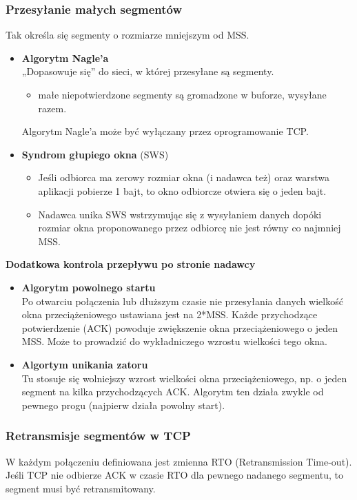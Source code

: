 \documentclass[../main.tex]{subfiles}
\begin{document}
    \subsubsection{Przesyłanie małych segmentów}
    Tak określa się segmenty o rozmiarze mniejszym od MSS.
    \begin{itemize}
        \item \textbf{Algorytm Nagle’a}\\
        „Dopasowuje się” do sieci, w której przesyłane są segmenty.
        \begin{itemize}
            \item małe niepotwierdzone segmenty są gromadzone w buforze, wysyłane razem.
        \end{itemize}
        Algorytm Nagle’a może być wyłączany przez oprogramowanie TCP.
        \item \textbf{Syndrom głupiego okna} (SWS)\\
        \begin{itemize}
            \item Jeśli odbiorca ma zerowy rozmiar okna (i nadawca też) oraz warstwa aplikacji pobierze 1
            bajt, to okno odbiorcze otwiera się o jeden bajt.
            \item Nadawca unika SWS wstrzymując się z wysyłaniem danych dopóki rozmiar okna proponowanego przez odbiorcę nie jest równy co najmniej MSS.
        \end{itemize}
    \end{itemize}

    \textbf{Dodatkowa kontrola przepływu po stronie nadawcy}\\
    \begin{itemize}
        \item \textbf{Algorytm powolnego startu}\\
        Po otwarciu połączenia lub dłuższym czasie nie przesyłania danych wielkość okna
        przeciążeniowego ustawiana jest na 2*MSS. Każde przychodzące potwierdzenie (ACK)
        powoduje zwiększenie okna przeciążeniowego o jeden MSS. Może to prowadzić do wykładniczego wzrostu wielkości tego okna.
        \item \textbf{Algortym unikania zatoru}\\
        Tu stosuje się wolniejszy wzrost wielkości okna przeciążeniowego, np. o jeden
        segment na kilka przychodzących ACK. Algorytm ten działa zwykle od pewnego progu (najpierw działa powolny start).
    \end{itemize}


    \subsubsection{Retransmisje segmentów w TCP}
    W każdym połączeniu definiowana jest zmienna RTO (Retransmission Time-out). Jeśli TCP nie
    odbierze ACK w czasie RTO dla pewnego nadanego segmentu, to segment musi być
    retransmitowany.
\end{document}
